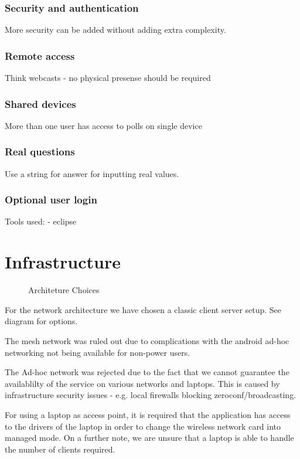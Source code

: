 \documentclass{acm_proc_article-sp}
\begin{document}
\subsubsection*{Security and authentication}
More security can be added without adding extra complexity.
\subsubsection*{Remote access}
Think webcasts - no physical presense should be required
\subsubsection*{Shared devices}
More than one user has access to polls on single device
\subsubsection*{Real questions}
Use a string for answer for inputting real values.

\subsubsection*{Optional user login}


Tools used:
 - eclipse

\section{Infrastructure}

\begin{figure}[h]
\centering
{}
\caption{Architeture Choices}
\label{fig:architeture_choices}
\end{figure}

For the network architecture we have chosen a classic client server setup. See diagram for options.

The mesh network was ruled out due to complications with the android ad-hoc networking not being available for non-power users.

The Ad-hoc network was rejected due to the fact that we cannot guarantee the availablilty of the service on various networks and laptops. This is caused by infrastructure security issues - e.g. local firewalls blocking zeroconf/broadcasting.

For using a laptop as access point, it is required that the application has access to the drivers of the laptop in order to change the wireless network card into managed mode. 
On a further note, we are unsure that a laptop is able to handle the number of clients required.
\end{document}
